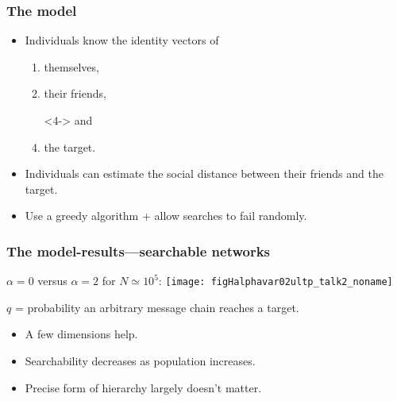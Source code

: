 \begin{frame}
  \frametitle{The model}

  \begin{block}{}
  \begin{itemize}
  \item<1-> 
    Individuals know the identity
    vectors of
    \begin{enumerate}
    \item<2-> 
      themselves,
    \item<3->  
      their friends,
    \item[]<4->  
      and
    \item<4->  
      the target.
    \end{enumerate}
  \item<5->
    Individuals can estimate the social distance
    between their friends and the target.
  \item<6->
    Use a greedy algorithm + allow searches to fail randomly.
  \end{itemize}
  \end{block}
  
\end{frame}


\begin{frame}
   \frametitle{The model-results---searchable networks}
 
   $\alpha=0$ versus $\alpha=2$ for $N \simeq 10^5$:
   \centering
   \texttt{[image: figHalphavar02ultp\_talk2\_noname]}%

\begin{block}{}
  $q$ = probability an arbitrary message
  chain reaches a target.

  \begin{itemize}
  \item<1-> A few dimensions help.\\
  \item<1-> Searchability decreases as population increases.\\
  \item<1-> Precise form of hierarchy largely doesn't matter.
  \end{itemize}
\end{block}

\end{frame}

